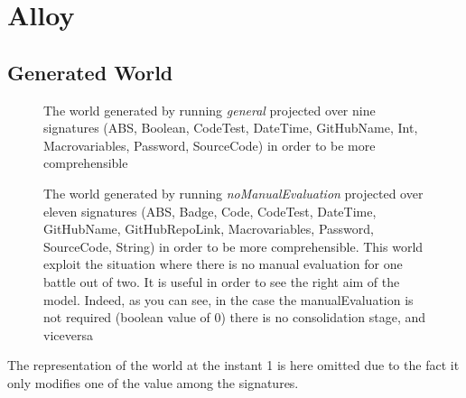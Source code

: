 \section{Alloy}
\lstset{
  language=alloy,
  basicstyle=\small\ttfamily,
  breaklines=true,
  showstringspaces=false
}


\subsection{Generated World}
\begin{figure}[h]
  \centering
  \caption{The world generated by running \textit{general} projected over nine signatures (ABS, Boolean, CodeTest, DateTime, GitHubName, Int, Macrovariables, Password, SourceCode) in order to be more comprehensible}
\end{figure}

\begin{figure}[h]
  \centering
  \caption{The world generated by running \textit{noManualEvaluation} projected over eleven signatures (ABS, Badge, Code, CodeTest, DateTime, GitHubName, GitHubRepoLink, Macrovariables, Password, SourceCode, String) in order to be more comprehensible. This world exploit the situation where there is no manual evaluation for one battle out of two. It is useful in order to see the right aim of the model. Indeed, as you can see, in the case the manualEvaluation is not required (boolean value of 0) there is no consolidation stage, and viceversa}
\end{figure}

The representation of the world at the instant 1 is here omitted due to the fact it only modifies one of the value among the signatures.